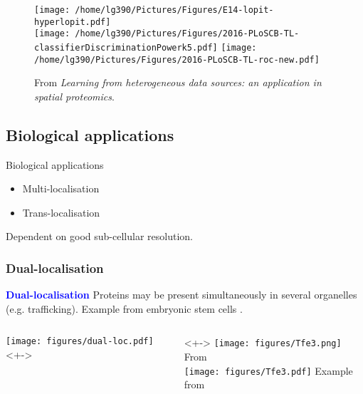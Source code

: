 \begin{frame}{}

  \begin{figure}[h]
    \centering
    \texttt{[image: /home/lg390/Pictures/Figures/E14-lopit-hyperlopit.pdf]} \\
    \texttt{[image: /home/lg390/Pictures/Figures/2016-PLoSCB-TL-classifierDiscriminationPowerk5.pdf]}
    \texttt{[image: /home/lg390/Pictures/Figures/2016-PLoSCB-TL-roc-new.pdf]}    
    \caption{{\footnotesize From \cite{Breckels:2016} \textit{Learning from
          heterogeneous data sources: an application in spatial
          proteomics}.}
    }
\label{fig:tlres}
  \end{figure}
  
\end{frame}

\subsection{Biological applications}

\begin{frame}{Biological applications}
  \begin{itemize}
  \item Multi-localisation
  \item Trans-localisation
  \end{itemize}
  Dependent on good sub-cellular resolution.
\end{frame}

\subsubsection{Dual-localisation}

\begin{frame}
  \textcolor{Blue}{\textbf{Dual-localisation}} Proteins may be present
  simultaneously in several organelles (e.g. trafficking). Example
  from embryonic stem cells \citep{Christoforou:2016}.
  \begin{columns}
    \begin{column}{.5\textwidth}
      \texttt{[image: figures/dual-loc.pdf]}<+->
    \end{column}
    \begin{column}{.5\textwidth}<+->
      \centering
      \texttt{[image: figures/Tfe3.png]}\\
      \tiny From \cite{Betschinger:2013} \\
      \texttt{[image: figures/Tfe3.pdf]}
      Example from 
    \end{column}  
  \end{columns}
\end{frame}

